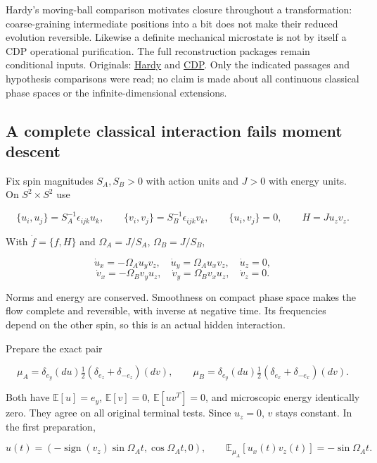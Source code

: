 \documentclass[11pt,a4paper]{article}
\begin{document}
Hardy's moving-ball comparison motivates closure throughout a
transformation: coarse-graining intermediate positions into a bit does
not make their reduced evolution reversible. Likewise a definite
mechanical microstate is not by itself a CDP operational purification.
The full reconstruction packages remain conditional inputs. Originals:
\href{https://arxiv.org/html/quant-ph/0101012v4}{Hardy} and
\href{https://arxiv.org/html/1011.6451v3}{CDP}. Only the indicated
passages and hypothesis comparisons were read; no claim is made about
all continuous classical phase spaces or the infinite-dimensional
extensions.

\hypertarget{a-complete-classical-interaction-fails-moment-descent}{%
\subsection{A complete classical interaction fails moment
descent}\label{a-complete-classical-interaction-fails-moment-descent}}

Fix spin magnitudes \(S_A,S_B>0\) with action units and \(J>0\) with
energy units. On \(S^2\times S^2\) use

\[\{u_i,u_j\}=S_A^{-1}\epsilon_{ijk}u_k,\qquad
\{v_i,v_j\}=S_B^{-1}\epsilon_{ijk}v_k,\qquad \{u_i,v_j\}=0,
\qquad H=J u_zv_z.\]

With \(\dot f=\{f,H\}\) and \(\Omega_A=J/S_A\), \(\Omega_B=J/S_B\),

\[\dot u_x=-\Omega_Au_yv_z,\quad\dot u_y=\Omega_Au_xv_z,\quad\dot u_z=0,\]
\[\dot v_x=-\Omega_Bv_yu_z,\quad\dot v_y=\Omega_Bv_xu_z,\quad\dot v_z=0.\]

Norms and energy are conserved. Smoothness on compact phase space makes
the flow complete and reversible, with inverse at negative time. Its
frequencies depend on the other spin, so this is an actual hidden
interaction.

Prepare the exact pair

\[\mu_A=\delta_{e_y}(du)\tfrac12(\delta_{e_z}+\delta_{-e_z})(dv),\qquad
\mu_B=\delta_{e_y}(du)\tfrac12(\delta_{e_x}+\delta_{-e_x})(dv).\]

Both have \(\mathbb E[u]=e_y\), \(\mathbb E[v]=0\),
\(\mathbb E[uv^T]=0\), and microscopic energy identically zero. They
agree on all original terminal tests. Since \(u_z=0\), \(v\) stays
constant. In the first preparation,

\[u(t)=(-\operatorname{sign}(v_z)\sin\Omega_At,\cos\Omega_At,0),\qquad
\mathbb E_{\mu_A}[u_x(t)v_z(t)]=-\sin\Omega_At.\]
\end{document}
